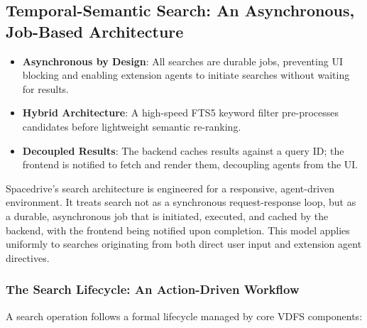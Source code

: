 \documentclass[sigconf]{acmart}
\begin{document}
\subsection{Temporal-Semantic Search: An Asynchronous, Job-Based Architecture}
\label{sec:temporal-semantic-search}

\begin{keytakeaways}
\begin{itemize}[noitemsep, topsep=0pt]
\item \textbf{Asynchronous by Design}: All searches are durable jobs, preventing UI blocking and enabling extension agents to initiate searches without waiting for results.
\item \textbf{Hybrid Architecture}: A high-speed FTS5 keyword filter pre-processes candidates before lightweight semantic re-ranking.
\item \textbf{Decoupled Results}: The backend caches results against a query ID; the frontend is notified to fetch and render them, decoupling agents from the UI.
\end{itemize}
\end{keytakeaways}

Spacedrive's search architecture is engineered for a responsive, agent-driven environment. It treats search not as a synchronous request-response loop, but as a durable, asynchronous job that is initiated, executed, and cached by the backend, with the frontend being notified upon completion. This model applies uniformly to searches originating from both direct user input and extension agent directives.

\subsubsection{The Search Lifecycle: An Action-Driven Workflow}
A search operation follows a formal lifecycle managed by core VDFS components:
\end{document}
